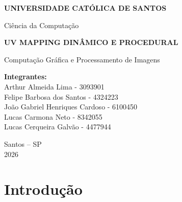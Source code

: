 \documentclass[12pt,a4paper]{report}
\begin{document}
\begin{titlepage}

    \centering

    \vspace*{1.5cm}

    {\Large \textbf{UNIVERSIDADE CATÓLICA DE SANTOS}\par}

    \vspace{0.5cm}

    {\large Ciência da Computação\par}

    \vspace{2.5cm}

    {\LARGE \textbf{UV MAPPING DINÂMICO E PROCEDURAL}\par}

    \vspace{1.5cm}

    {\large Computação Gráfica e Processamento de Imagens\par}

    \vfill

    \begin{flushleft}

    \textbf{Integrantes:}\\[0.2cm]

    Arthur Almeida Lima - 3093901\\
    Felipe Barbosa dos Santos - 4324223\\
    João Gabriel Henriques Cardoso - 6100450\\
    Lucas Carmona Neto - 8342055\\
    Lucas Cerqueira Galvão - 4477944\\

    \end{flushleft}

    \vfill

    {\large
    Santos -- SP\\
    2026
    \par}

\end{titlepage}

\tableofcontents

\clearpage


\chapter{Introdução}


\end{document}
